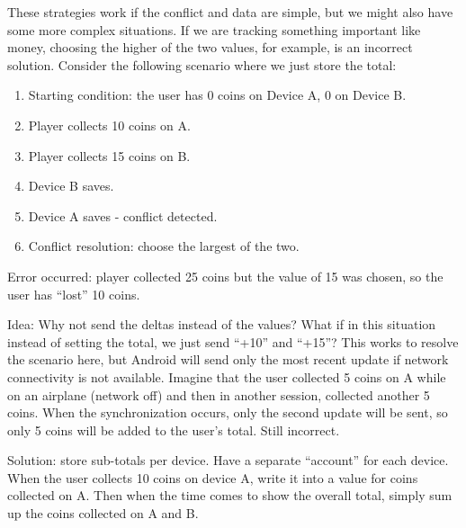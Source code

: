These strategies work if the conflict and data are simple, but we might also have some more complex situations. If we are tracking something important like money, choosing the higher of the two values, for example, is an incorrect solution. Consider the following scenario where we just store the total:

\begin{enumerate}
	\item Starting condition: the user has 0 coins on Device A, 0 on Device B.
	\item Player collects 10 coins on A.
	\item Player collects 15 coins on B.
	\item Device B saves.
	\item Device A saves - conflict detected.
	\item Conflict resolution: choose the largest of the two.
\end{enumerate}
Error occurred: player collected 25 coins but the value of 15 was chosen, so the user has ``lost'' 10 coins.

Idea: Why not send the deltas instead of the values? What if in this situation instead of setting the total, we just send ``+10'' and ``+15''? This works to resolve the scenario here, but Android will send only the most recent update if network connectivity is not available. Imagine that the user collected 5 coins on A while on an airplane (network off) and then in another session, collected another 5 coins. When the synchronization occurs, only the second update will be sent, so only 5 coins will be added to the user's total. Still incorrect.

Solution: store sub-totals per device. Have a separate ``account'' for each device. When the user collects 10 coins on device A, write it into a value for coins collected on A. Then when the time comes to show the overall total, simply sum up the coins collected on A and B.



